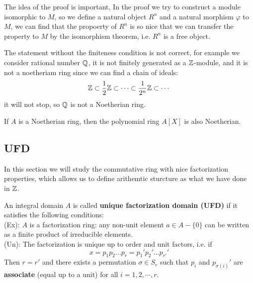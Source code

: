 The idea of the proof is important, In the proof we try to construct a module isomorphic to \(M\), so we define a natural object \(R^n\) and a natural morphism \(\varphi\) to \(M\), we can find that the propoerty of \(R^n\) is so nice that we can transfer the property to \(M\) by the isomorphism theorem, i.e. \(R^n\) is a free object.

The statement without the finiteness condition is not correct, for example we consider rational number \(\mathbb{Q}\), it is not finitely generated as a \(\mathbb{Z}\)-module, and it is not a noetheriam ring since we can find a chain of ideals:
\[\mathbb{Z} \subset \frac{1}{2}\mathbb{Z} \subset \cdots \subset \frac{1}{2^n}\mathbb{Z} \subset \cdots\]
it will not stop, so \(\mathbb{Q}\) is not a Noetherian ring.
\begin{theorem}
    If \(A\) is a Noetherian ring, then the polynomial ring \(A[X]\) is also Noetherian.
\end{theorem}

\subsection{UFD}
In this section we will study the commutative ring with nice factorization properties, which allows us to define arithemtic sturcture as what we have done in \(\mathbb{Z}\).

\begin{definition}
    An integral domain \(A\) is called \textbf{unique factorization domain (UFD)} if it satisfies the following conditions:\\

    (Ex): \(A\) is a factorization ring: any non-unit element \(a \in A-\{0\}\) can be written as a finite product of irreducible elements.\\

    (Un): The factorization is unique up to order and unit factors, i.e. if
    \[x = p_1p_2\dots p_r = p_1'p_2'\dots  p_{r'}'\]
    Then \(r = r'\) and there exists a permutation \(\sigma \in S_r\) such that \(p_i\) and \(p_{\sigma(i)}'\) are \textbf{associate} (equal up to a unit) for all \(i=1,2,\cdots,r\).
\end{definition}

